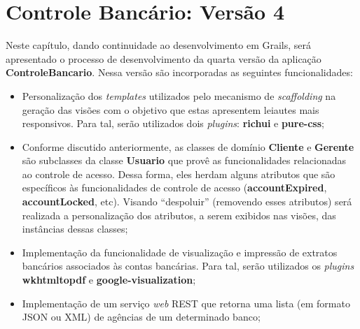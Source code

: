 \chapter{Controle Bancário: Versão 4}\label{interface}

Neste  capítulo,   dando  continuidade   ao  desenvolvimento  em   Grails,  será
apresentado o  processo de  desenvolvimento da quarta  versão da  aplicação {\bf
  ControleBancario}. Nessa versão são incorporadas as seguintes funcionalidades:

\begin{itemize}

\vspace{0.5cm}

\item  Personalização dos  {\it  templates} utilizados  pelo  mecanismo de  {\it
  scaffolding}  na  geração das  visões  com  o  objetivo que  estas  apresentem
  leiautes  mais responsivos.  Para  tal, serão  utilizados dois  {\it plugins}:
  {\bf richui} e {\bf pure-css}; 

\vspace{0.5cm}

\item Conforme  discutido anteriormente, as  classes de domínio {\bf  Cliente} e
  {\bf  Gerente}   são  subclasses  da   classe  {\bf  Usuario}  que   provê  as
  funcionalidades relacionadas ao controle  de acesso.  Dessa forma, eles herdam
  alguns atributos que são específicos  às funcionalidades de controle de acesso
  ({\bf  accountExpired},  {\bf   accountLocked},  etc).  Visando  ``despoluir''
  (removendo esses  atributos) será realizada a personalização  dos atributos, a
  serem exibidos nas visões, das instâncias dessas classes; 

\vspace{0.5cm}

\item Implementação  da funcionalidade de  visualização e impressão  de extratos
  bancários associados às  contas bancárias. Para tal, serão  utilizados os {\it
    plugins} {\bf wkhtmltopdf} e {\bf google-visualization};

\vspace{0.5cm}

\item  Implementação de  um serviço  {\it web}  REST que  retorna uma  lista (em
  formato JSON ou XML) de agências de um determinado banco; 

\end{itemize}

